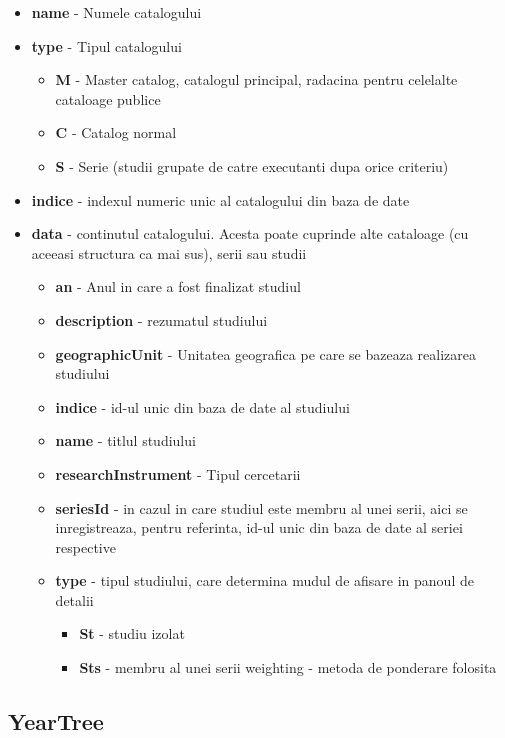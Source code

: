 \begin{itemize}
\item \textbf{name} - Numele catalogului 
\item \textbf{type} - Tipul catalogului 

\begin{itemize}
\item \textbf{M} - Master catalog, catalogul principal, radacina pentru
celelalte cataloage publice 
\item \textbf{C} - Catalog normal 
\item \textbf{S} - Serie (studii grupate de catre executanti dupa orice
criteriu) 
\end{itemize}
\item \textbf{indice} - indexul numeric unic al catalogului din baza de
date 
\item \textbf{data} - continutul catalogului. Acesta poate cuprinde alte
cataloage (cu aceeasi structura ca mai sus), serii sau studii 

\begin{itemize}
\item \textbf{an} - Anul in care a fost finalizat studiul 
\item \textbf{description} - rezumatul studiului 
\item \textbf{geographicUnit} - Unitatea geografica pe care se bazeaza realizarea
studiului 
\item \textbf{indice} - id-ul unic din baza de date al studiului 
\item \textbf{name} - titlul studiului 
\item \textbf{researchInstrument }- Tipul cercetarii 
\item \textbf{seriesId} - in cazul in care studiul este membru al unei serii,
aici se inregistreaza, pentru referinta, id-ul unic din baza de date
al seriei respective 
\item \textbf{type} - tipul studiului, care determina mudul de afisare in
panoul de detalii 

\begin{itemize}
\item \textbf{St} - studiu izolat 
\item \textbf{Sts} - membru al unei serii weighting - metoda de ponderare
folosita
\end{itemize}
\end{itemize}
\end{itemize}

\subsection{YearTree}

